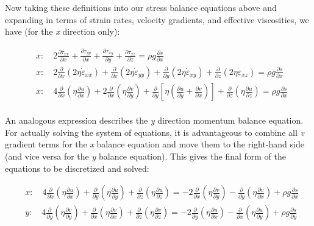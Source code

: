 Now taking these definitions into our stress balance equations above and expanding in terms of strain rates, velocity gradients, and effective viscosities, we have (for the \textit{x} direction only):

\begin{align*}
  & x:\quad 2\frac{\partial \tau _{xx}}{\partial x}+\frac{\partial \tau _{yy}}{\partial x}+\frac{\partial \tau _{xy}}{\partial y}+\frac{\partial \tau _{xz}}{\partial z}=\rho g\frac{\partial s}{\partial x} \\ 
 & x:\quad 2\frac{\partial }{\partial x}\left( 2\eta \dot{\varepsilon }_{xx} \right)+\frac{\partial }{\partial x}\left( 2\eta \dot{\varepsilon }_{yy} \right)+\frac{\partial }{\partial y}\left( 2\eta \dot{\varepsilon }_{xy} \right)+\frac{\partial }{\partial z}\left( 2\eta \dot{\varepsilon }_{xz} \right)=\rho g\frac{\partial s}{\partial x} \\ 
 & x:\quad 4\frac{\partial }{\partial x}\left( \eta \frac{\partial u}{\partial x} \right)+2\frac{\partial }{\partial x}\left( \eta \frac{\partial v}{\partial y} \right)+\frac{\partial }{\partial y}\left[ \eta \left( \frac{\partial u}{\partial y}+\frac{\partial v}{\partial x} \right) \right]+\frac{\partial }{\partial z}\left( \eta \frac{\partial u}{\partial z} \right)=\rho g\frac{\partial s}{\partial x} \\ 
\end{align*}


An analogous expression describes the \textit{y} direction momentum balance equation. For actually solving the system of equations, it is advantageous to combine all \textit{v} gradient terms for the \textit{x} balance equation and move them to the right-hand side (and vice versa for the \textit{y} balance equation). This gives the final form of the equations to be discretized and solved:


\begin{align*}
  & x:\quad 4\frac{\partial }{\partial x}\left( \eta \frac{\partial u}{\partial x} \right)+\frac{\partial }{\partial y}\left( \eta \frac{\partial u}{\partial y} \right)+\frac{\partial }{\partial z}\left( \eta \frac{\partial u}{\partial z} \right)=-2\frac{\partial }{\partial x}\left( \eta \frac{\partial v}{\partial y} \right)-\frac{\partial }{\partial y}\left( \eta \frac{\partial v}{\partial x} \right)+\rho g\frac{\partial s}{\partial x} \\ 
 & y:\quad 4\frac{\partial }{\partial y}\left( \eta \frac{\partial v}{\partial y} \right)+\frac{\partial }{\partial x}\left( \eta \frac{\partial v}{\partial x} \right)+\frac{\partial }{\partial z}\left( \eta \frac{\partial v}{\partial z} \right)=-2\frac{\partial }{\partial y}\left( \eta \frac{\partial u}{\partial x} \right)-\frac{\partial }{\partial x}\left( \eta \frac{\partial u}{\partial y} \right)+\rho g\frac{\partial s}{\partial y} \\ 
\end{align*}

